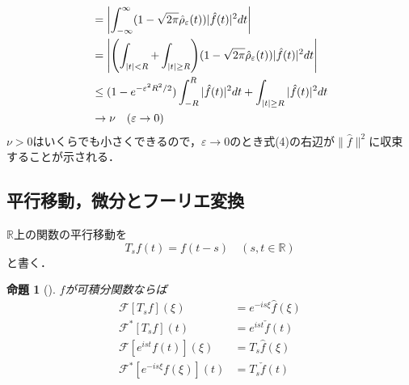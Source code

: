 \documentclass[dvipdfmx,a4j,10pt]{jsarticle}
\makeatletter
\theoremstyle{mystyle1}
\newtheorem{proposition}[theorem]{命題}
\theoremstyle{mystyle3}
\theoremstyle{mystyle4}
\theoremstyle{mystyle6}
\theoremstyle{mystyle2}
\theoremstyle{mystyle5}
\renewenvironment{proof}[1][\proofname]{\par
  \pushQED{\qed}%
  \normalfont
  \topsep6\p@\@plus6\p@ \trivlist
  \item[\hskip\labelsep{\bfseries\sffamily #1}]\ignorespaces
}{%
  \popQED\endtrivlist\@endpefalse
}
\renewcommand\proofname{証明}
\newenvironment{prop}[1][]
{\begin{tcolorbox}[
    enhanced,
    boxrule=0pt,
    arc=0mm,
    frame hidden,
    borderline west={2pt}{-4pt}{blue!50!black},
    breakable = true
    ]
    \begin{proposition}[#1]
}
{\end{proposition}\end{tcolorbox}}
\makeatother
\begin{document}
\begin{proof}
\[\begin{split}
			&=\mleft|\int_{-\infty}^\infty (1-\sqrt{2\pi}\hat\rho_\varepsilon(t))|\hat f(t)|^2dt\mright| \\
			&=\mleft|\mleft(\int_{|t|<R}+\int_{|t|\geq R}\mright)(1-\sqrt{2\pi}\hat\rho_\varepsilon(t))|\hat f(t)|^2dt\mright| \\
			&\leq (1-e^{-\varepsilon^2R^2/2})\int_{-R}^R|\hat f(t)|^2dt+\int_{|t|\geq R}|\hat f(t)|^2dt \\
			&\to\nu\quad(\varepsilon\to 0)
		\end{split}
	\]
	$\nu>0$はいくらでも小さくできるので，$\varepsilon\to 0$のとき式(4)の右辺が$\|\hat f\|^2$に収束することが示される．
\end{proof}

\subsection{平行移動，微分とフーリエ変換}

$\mathbb{R}$上の関数の平行移動を
\[
	T_sf(t)=f(t-s)\quad(s,t\in\mathbb{R})
\]
と書く．

\begin{prop}\label{prop:3-8}
	$f$が可積分関数ならば
	\[
		\begin{split}
			\mathcal{F}[T_sf](\xi)&=e^{-is\xi}\hat f(\xi) \\
			\mathcal{F}^*[T_sf](t)&=e^{ist}\check f(t) \\
			\mathcal{F}[e^{ist}f(t)](\xi)&=T_s\hat f(\xi) \\
			\mathcal{F}^*[e^{-is\xi}f(\xi)](t)&=T_s\check f(t)
		\end{split}
	\]
\end{prop}
\end{document}
